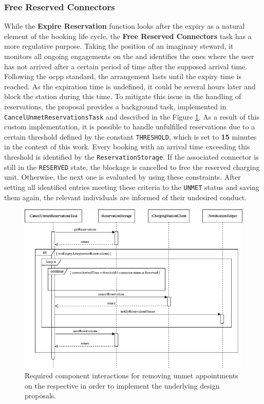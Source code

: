 \newpage

\subsubsection{Free Reserved Connectors}
\label{ch:Implementation:sec:Reservation System:ssec:Scheduling Capabilities:sssec:Free Reserved Connectors}

While the \textbf{Expire Reservation} function looks after the expiry as a natural element of the booking life cycle, the \textbf{Free Reserved Connectors} task has a more regulative purpose.
Taking the position of an imaginary steward, it monitors all ongoing engagements on the  and identifies the ones where the user has not arrived after a certain period of time after the supposed arrival time.
Following the \acrshort{ocpp} standard, the arrangement lasts until the expiry time is reached. As the expiration time is undefined, it could be several hours later and block the station during this time. 
To mitigate this issue in the handling of reservations, the proposal provides a background task, implemented in \texttt{CancelUnmetReservationsTask} and described in the Figure \ref{fig:free-connector-seqflow}.
As a result of this custom implementation, it is possible to handle unfulfilled reservations due to a certain threshold defined by the constant \texttt{THRESHOLD}, which is set to \textbf{15} minutes in the context of this work.
Every booking with an arrival time exceeding this threshold is identified by the \texttt{ReservationStorage}. If the associated connector is still in the \texttt{RESERVED} state, the blockage is cancelled to free the reserved charging unit.
Otherwise, the next one is evaluated by using these constraints.
After setting all identified entries meeting these criteria to the \texttt{UNMET} status and saving them again, the relevant individuals are informed of their undesired conduct.

\begin{figure}[h]
    \centering
    \includegraphics[scale=0.5]{resources/images/main/6_implementation/processes/scheduler/CancelUnmetReservation.png}
    \caption{Required component interactions for removing unmet appointments on the respective  in order to implement the underlying design proposals.}
    \label{fig:free-connector-seqflow}
\end{figure}


